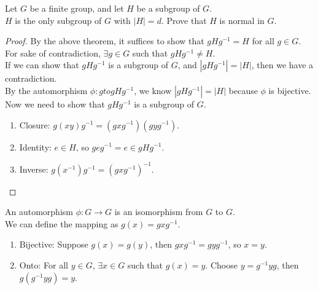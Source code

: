 \begin{eg}
    Let $G$ be a finite group, and let $H$ be a subgroup of $G$.\\
    $H$ is the only subgroup of $G$ with $|H| = d$. Prove that $H$ is normal in $G$.\\
\end{eg}
\begin{proof}
    By the above theorem, it suffices to show that $gHg^{-1} = H$ for all $g \in G$.\\
    For sake of contradiction, $\exists g \in G$ such that $gHg^{-1} \neq H$.\\
    If we can show that $gHg^{-1}$ is a subgroup of $G$, and $|gHg^{-1}| = |H|$, then we have a contradiction.\\ 
    By the automorphism $\phi: g to gHg^{-1}$, we know $|gHg^{-1}| = |H|$ because $\phi$ is bijective.\\
    Now we need to show that $gHg^{-1}$ is a subgroup of $G$.\\
    \begin{enumerate}
        \item Closure: $g(xy)g^{-1} = (gxg^{-1})(gyg^{-1})$.
        \item Identity: $e \in H$, so $geg^{-1} = e \in gHg^{-1}$.
        \item Inverse: $g(x^{-1})g^{-1} = (gxg^{-1})^{-1}$.
    \end{enumerate}
\end{proof}

\begin{definition}[Automorphism]
    An automorphism $\phi: G \to G$ is an isomorphism from $G$ to $G$.\\
    We can define the mapping as $g(x) = gxg^{-1}$.
    \begin{enumerate}
        \item Bijective: Suppose $g(x) = g(y)$, then $gxg^{-1} = gyg^{-1}$, so $x = y$.
        \item Onto: For all $y \in G$, $\exists x \in G$ such that $g(x) = y$. Choose $y = g^{-1}yg$, then $g(g^{-1}yg) = y$.
    \end{enumerate}
\end{definition}
